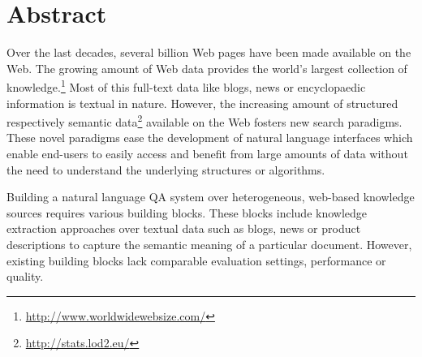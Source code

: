 \chapter*{Abstract}
Over the last decades, several billion Web pages have been made available on the Web. 
The growing amount of Web data provides the world's largest collection of knowledge.\footnote{\url{http://www.worldwidewebsize.com/}} 
Most of this full-text data like blogs, news or encyclopaedic information is textual in nature.
However, the increasing amount of structured respectively semantic data\footnote{\url{http://stats.lod2.eu/}} available on the Web fosters new search paradigms.
These novel paradigms ease the development of natural language interfaces which enable end-users to easily access and benefit from large amounts of data without the need to understand the underlying structures or algorithms.

Building a natural language \ac{QA} system over heterogeneous, web-based knowledge sources requires various building blocks.
These blocks include knowledge extraction approaches over textual data such as blogs, news or product descriptions to capture the semantic meaning of a particular document.
However, existing building blocks lack comparable evaluation settings, performance or quality. 

